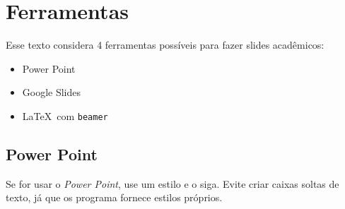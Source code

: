 \section{Ferramentas}

Esse texto considera 4 ferramentas possíveis para fazer slides acadêmicos:
\begin{itemize}
    \item Power Point
    \item Google Slides
    \item \LaTeX\  com \texttt{beamer}
\end{itemize}

\subsection{Power Point}

Se for usar o \textit{Power Point}, use um estilo e o siga. Evite criar caixas soltas de texto, já que os programa fornece estilos próprios.

